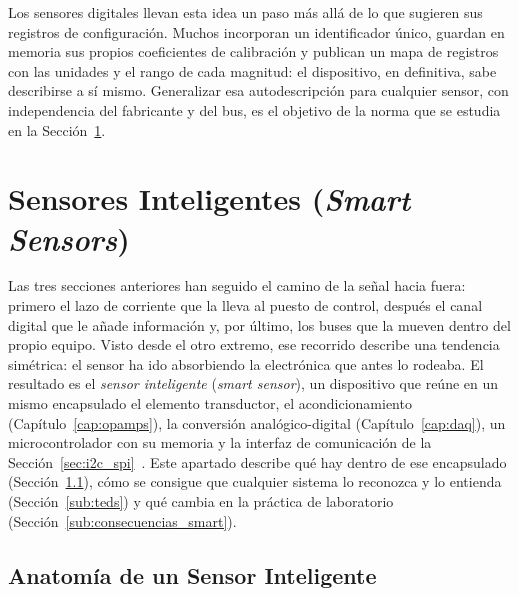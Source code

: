 Los sensores digitales llevan esta idea un paso más allá de lo que sugieren sus registros de configuración. Muchos incorporan un identificador único, guardan en memoria sus propios coeficientes de calibración y publican un mapa de registros con las unidades y el rango de cada magnitud: el dispositivo, en definitiva, sabe describirse a sí mismo. Generalizar esa autodescripción para cualquier sensor, con independencia del fabricante y del bus, es el objetivo de la norma que se estudia en la Sección~\ref{sec:smart_sensors}.

\section{Sensores Inteligentes (\textit{Smart Sensors})}\label{sec:smart_sensors}

Las tres secciones anteriores han seguido el camino de la señal hacia fuera: primero el lazo de corriente que la lleva al puesto de control, después el canal digital que le añade información y, por último, los buses que la mueven dentro del propio equipo. Visto desde el otro extremo, ese recorrido describe una tendencia simétrica: el sensor ha ido absorbiendo la electrónica que antes lo rodeaba. El resultado es el \emph{sensor inteligente} (\textit{smart sensor}), un dispositivo que reúne en un mismo encapsulado el elemento transductor, el acondicionamiento (Capítulo~\ref{cap:opamps}), la conversión analógico-digital (Capítulo~\ref{cap:daq}), un microcontrolador con su memoria y la interfaz de comunicación de la Sección~\ref{sec:i2c_spi}~\cite{frank2013smartsensors}. Este apartado describe qué hay dentro de ese encapsulado (Sección~\ref{sub:anatomia_sensor}), cómo se consigue que cualquier sistema lo reconozca y lo entienda (Sección~\ref{sub:teds}) y qué cambia en la práctica de laboratorio (Sección~\ref{sub:consecuencias_smart}).


\subsection{Anatomía de un Sensor Inteligente}\label{sub:anatomia_sensor}

